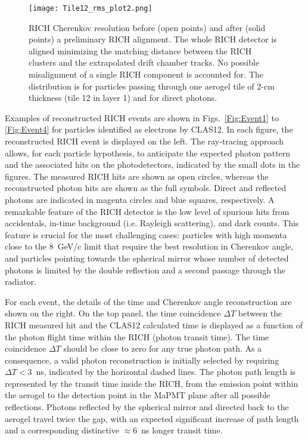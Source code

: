 \documentclass[5p,times,twocolumn]{elsarticle}
\begin{document}
\begin{figure}[t]
\begin{center}
\texttt{[image: Tile12\_rms\_plot2.png]}
\end{center}
\caption{RICH Cherenkov resolution before (open points) and after (solid points) a preliminary RICH alignment. The whole RICH
  detector is aligned minimizing the matching distance between the RICH clusters and the extrapolated drift chamber tracks. No
  possible misalignment of a single RICH component is accounted for. The distribution is for particles passing through
  one aerogel tile of 2-cm thickness (tile 12 in layer 1) and for direct photons.}
\label{Fig:Align}
\end{figure}

Examples of reconstructed RICH events are shown in Figs.~\ref{Fig:Event1} to \ref{Fig:Event4} for particles
identified as electrons by CLAS12. In each figure, the reconstructed RICH event is displayed on the left. The
ray-tracing approach allows, for each particle hypothesis, to anticipate the expected photon pattern and the associated
hits on the photodetectors, indicated by the small dots in the figures.
The measured RICH hits are shown as open circles, whereas the reconstructed photon hits are shown as the full
symbols. Direct and reflected photons are indicated in magenta circles and blue squares, respectively. A remarkable feature of the
RICH detector is the low level of spurious hits from accidentals, in-time background (i.e. Rayleigh scattering), and
dark counts. This feature is crucial for the most challenging cases: particles with high momenta close to the 8~GeV/c
limit that require the best resolution in Cherenkov angle, and particles pointing towards the spherical mirror whose
number of detected photons is limited by the double reflection and a second passage through the radiator. 

For each event, the details of the time and Cherenkov angle reconstruction are shown on the right. On the top panel,
the time coincidence $\Delta T$ between the RICH measured hit and the CLAS12 calculated time is displayed as a
function of the photon flight time within the RICH (photon transit time). The time coincidence $\Delta T$ should be
close to zero for any true photon path. As a consequence, a valid photon reconstruction is initially selected by
requiring $\Delta T<3$~ns, indicated by the horizontal dashed lines. The photon path length is represented by the 
transit time inside the RICH, from the emission point within the aerogel to the detection point in the MaPMT plane
after all possible reflections. Photons reflected by the spherical mirror and directed back to the aerogel travel
twice the gap, with an expected significant increase of path length and a corresponding distinctive $\approx$6~ns
longer transit time. %
\end{document}
